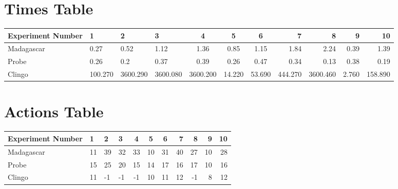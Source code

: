 \documentclass[8pt]{article}
\begin{document}
\begin{landscape}
\section{Times Table}\begin{tabular}{ | l | l | l | l | c | c | c | r | r | r | r | }\hline
Experiment Number & 1 & 2 & 3 & 4 & 5 & 6 & 7 & 8 & 9 & 10\\  \hline
Madagascar & 0.27 & 0.52 & 1.12 & 1.36 & 0.85 & 1.15 & 1.84 & 2.24 & 0.39 & 1.39\\  \hline
Probe & 0.26 & 0.2 & 0.37 & 0.39 & 0.26 & 0.47 & 0.34 & 0.13 & 0.38 & 0.19\\  \hline
Clingo & 100.270 & 3600.290 & 3600.080 & 3600.200 & 14.220 & 53.690 & 444.270 & 3600.460 & 2.760 & 158.890\\  \hline
\end{tabular}
\section{Actions Table}\begin{tabular}{ | l | l | l | l | c | c | c | r | r | r | r | }\hline
Experiment Number & 1 & 2 & 3 & 4 & 5 & 6 & 7 & 8 & 9 & 10\\ \hline
 Madagascar & 11 & 39 & 32 & 33 & 10 & 31 & 40 & 27 & 10 & 28\\ \hline
 Probe & 15 & 25 & 20 & 15 & 14 & 17 & 16 & 17 & 10 & 16\\ \hline
 Clingo & 11 & -1 & -1 & -1 & 10 & 11 & 12 & -1 & 8 & 12\\ \hline
\end{tabular}
\end{landscape}
\end{document}
